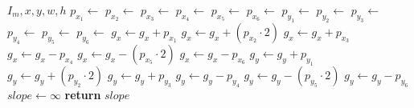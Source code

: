 \begin{algorithm}[!ht]
\caption{}
\label{alg:gradientintensity}
\begin{algorithmic}[1]
	\Require $I_m, x, y, w, h$
	\State $p_{x_1} \gets$ 
	\label{alg:gradientintensity-readstart}
	\State $p_{x_2} \gets$ 
	\State $p_{x_3} \gets$ 
	\State $p_{x_4} \gets$ 
	\State $p_{x_5} \gets$ 
	\State $p_{x_6} \gets$ 
	\State $p_{y_1} \gets$ 
	\State $p_{y_2} \gets$ 
	\State $p_{y_3} \gets$ 
	\State $p_{y_4} \gets$ 
	\State $p_{y_5} \gets$ 
	\State $p_{y_6} \gets$ 
	\label{alg:gradientintensity-readend}
	\State $g_x \gets g_x + p_{x_1}$
	\label{alg:gradientintensity-convolutestart}
	\State $g_x \gets g_x + \left(p_{x_2} \cdot 2\right)$
	\State $g_x \gets g_x + p_{x_3}$
	\State $g_x \gets g_x - p_{x_4}$
	\State $g_x \gets g_x - \left(p_{x_5} \cdot 2\right)$
	\State $g_x \gets g_x - p_{x_6}$
	\State $g_y \gets g_y + p_{y_1}$
	\State $g_y \gets g_y + \left(p_{y_2} \cdot 2\right)$
	\State $g_y \gets g_y + p_{y_3}$
	\State $g_y \gets g_y - p_{y_4}$
	\State $g_y \gets g_y - \left(p_{y_5} \cdot 2\right)$
	\State $g_y \gets g_y - p_{y_6}$
	\label{alg:gradientintensity-convoluteend}
	\State $\mathit{slope} \gets \infty$
	\State {}
	\label{alg:gradientintensity-vector-start}
	\State {}
	\label{alg:gradientintensity-vector-end}
	\State \textbf{return} $\mathit{slope}$
\end{algorithmic}
\end{algorithm}
